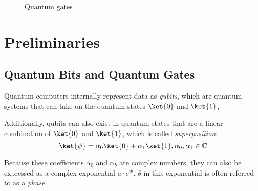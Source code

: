 \begin{figure}[t]
  \begin{minipage}{0.45\linewidth}
    \centering
    \scalebox{1.0} {
      
    }
    \scalebox{1.0} {
      
    }
    \scalebox{1.0}{
      
    }
    \scalebox{1.0} {
      
    }
  \end{minipage}
  \begin{minipage}{0.45\linewidth}
  \centering
    \scalebox{1.0} {
      
    }
    \scalebox{1.0} {
      
    }
    \scalebox{1.0} {
      
    }
    \scalebox{1.0} {
      
    }
  \end{minipage}
  \caption{Quantum gates}
  \label{fig-gates}
\end{figure}


\section{Preliminaries}

\subsection{Quantum Bits and Quantum Gates}
\label{Chap:Pre-qubits}
Quantum computers internally represent data as \emph{qubits}, which are quantum systems that can
take on the quantum states $\ket{0}$ and $\ket{1}$,

Additionally, qubits can also exist in quantum states that are a linear combination of $\ket{0}$ and
$\ket{1}$, which is called {\it superposition}:
\begin{equation}
\ket{\psi} = \alpha_0 \ket{0} + \alpha_1 \ket{1}, \alpha_0, \alpha_1 \in \mathbb{C}
\end{equation}

Because these coefficients $\alpha_0$ and $\alpha_b$ are complex numbers, they can also be expressed as
a complex exponential $a\cdot e^{i \theta}$.
$\theta$ in this exponential is often referred to as a {\it phase}.

